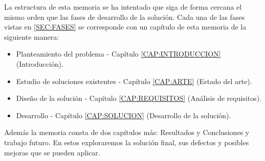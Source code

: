 La estructura de esta memoria se ha intentado que siga de forma cercana el mismo orden que las fases de desarrollo de la solución. Cada una de las fases vistas en \ref{SEC:FASES} se corresponde con un capítulo de esta memoria de la siguiente manera:

\begin{itemize}
    \item Planteamiento del problema - Capítulo \ref{CAP:INTRODUCCION} (Introducción).
    \item Estudio de soluciones existentes - Capítulo \ref{CAP:ARTE} (Estado del arte).
    \item Diseño de la solución - Capítulo \ref{CAP:REQUISITOS} (Análisis de requisitos).
    \item Desarrollo - Capítulo \ref{CAP:SOLUCION} (Desarrollo de la solución).
\end{itemize}

Además la memoria consta de dos capítulos más: Resultados y Conclusiones y trabajo futuro. En estos exploraremos la solución final, sus defectos y posibles mejoras que se pueden aplicar.
